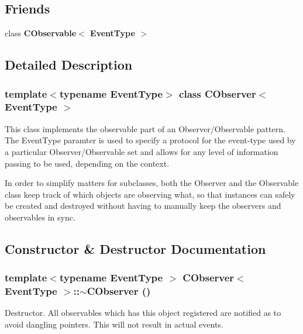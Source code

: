 \subsection*{Friends}
\begin{DoxyCompactItemize}
\item 
class {\bf CObservable$<$ EventType $>$}\label{classCObserver_acca93c09fd9bfd324d55b64e3660dc13}

\end{DoxyCompactItemize}


\subsection{Detailed Description}
\subsubsection*{template$<$typename EventType$>$ class CObserver$<$ EventType $>$}

This class implements the observable part of an Observer/Observable pattern. The EventType paramter is used to specify a protocol for the event-\/type used by a particular Observer/Observable set and allows for any level of information passing to be used, depending on the context.

In order to simplify matters for subclasses, both the Observer and the Observable class keep track of which objects are observing what, so that instances can safely be created and destroyed without having to manually keep the observers and observables in sync. 

\subsection{Constructor \& Destructor Documentation}
\subsubsection[{$\sim$CObserver}]{\setlength{\rightskip}{0pt plus 5cm}template$<$typename EventType $>$ {\bf CObserver}$<$ EventType $>$::$\sim${\bf CObserver} ()\hspace{0.3cm}{\ttfamily  [inline, virtual]}}\label{classCObserver_a82118c156d434d3eb15cc0080f9409ef}


Destructor. All observables which has this object registered are notified as to avoid dangling pointers. This will not result in actual events. 

